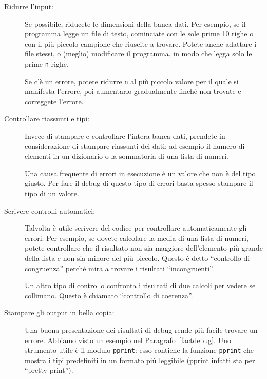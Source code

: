 \documentclass[10pt]{book}
\begin{document}
\begin{description}

\item[Ridurre l'input:] Se possibile, riducete le dimensioni della banca dati. Per esempio, se il programma legge un file di testo, cominciate con le sole prime 10 righe o con il più piccolo campione che riuscite a trovare. Potete anche adattare i file stessi, o (meglio) modificare il programma, in modo che legga solo le prime {\tt n} righe.

Se c'è un errore, potete ridurre {\tt n} al più piccolo valore per il quale si manifesta l'errore, poi aumentarlo gradualmente finché non trovate e correggete l'errore.

\item[Controllare riassunti e tipi:] Invece di stampare e controllare l'intera banca dati, prendete in considerazione di stampare riassunti dei dati: ad esempio il numero di elementi in un dizionario o la sommatoria di una lista di numeri.

Una causa frequente di errori in esecuzione è un valore che non è del tipo giusto. Per fare il debug di questo tipo di errori basta spesso stampare il tipo di un valore.

\item[Scrivere controlli automatici:]  Talvolta è utile scrivere del codice per controllare automaticamente gli errori. Per esempio, se dovete calcolare la media di una lista di numeri, potete controllare che il risultato non sia maggiore dell'elemento più grande della lista e non sia minore del più piccolo. Questo è detto ``controllo di congruenza'' perché mira a trovare i risultati ``incongruenti''.

Un altro tipo di controllo confronta i risultati di due calcoli per vedere se collimano. Questo è chiamato ``controllo di coerenza''.

\item[Stampare gli output in bella copia:] Una buona presentazione dei risultati di debug rende più facile trovare un errore. Abbiamo visto un esempio nel Paragrafo~\ref{factdebug}.  Uno strumento utile è il modulo {\tt pprint}: esso contiene la funzione {\tt pprint} che mostra i tipi predefiniti in un formato più leggibile (pprint infatti sta per ``pretty print'').

\end{description}
\end{document}

